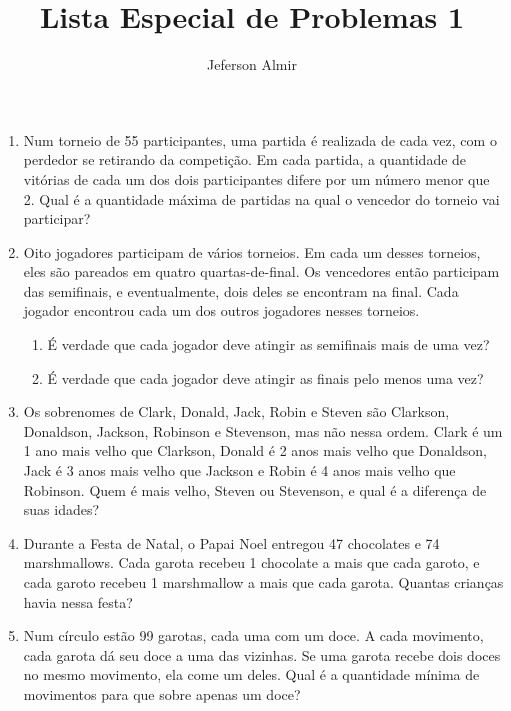\documentclass{article}
\title{Lista Especial de Problemas 1}
\author{Jeferson Almir}
\date{}
\begin{document}
\maketitle

\begin{enumerate}
    \item Num torneio de 55 participantes, uma partida é realizada de cada vez, com o perdedor se retirando da competição. Em cada partida, a quantidade de vitórias de cada um dos dois participantes difere por um número menor que 2. Qual é a quantidade máxima de partidas na qual o vencedor do torneio vai participar?

    \item Oito jogadores participam de vários torneios. Em cada um desses torneios, eles são pareados em quatro quartas-de-final. Os vencedores então participam das semifinais, e eventualmente, dois deles se encontram na final. Cada jogador encontrou cada um dos outros jogadores nesses torneios.

    \begin{enumerate}
        \item É verdade que cada jogador deve atingir as semifinais mais de uma vez?

        \item É verdade que cada jogador deve atingir as finais pelo menos uma vez?
    \end{enumerate}

    \item Os sobrenomes de Clark, Donald, Jack, Robin e Steven são Clarkson, Donaldson, Jackson, Robinson e Stevenson, mas não nessa ordem. Clark é um 1 ano mais velho que Clarkson, Donald é 2 anos mais velho que Donaldson, Jack é 3 anos mais velho que Jackson e Robin é 4 anos mais velho que Robinson. Quem é mais velho, Steven ou Stevenson, e qual é a diferença de suas idades?

    \item Durante a Festa de Natal, o Papai Noel entregou 47 chocolates e 74 marshmallows. Cada garota recebeu 1 chocolate a mais que cada garoto, e cada garoto recebeu 1 marshmallow a mais que cada garota. Quantas crianças havia nessa festa?

    \item Num círculo estão 99 garotas, cada uma com um doce. A cada movimento, cada garota dá seu doce a uma das vizinhas. Se uma garota recebe dois doces no mesmo movimento, ela come um deles. Qual é a quantidade mínima de movimentos para que sobre apenas um doce?


\end{enumerate}
\end{document}
